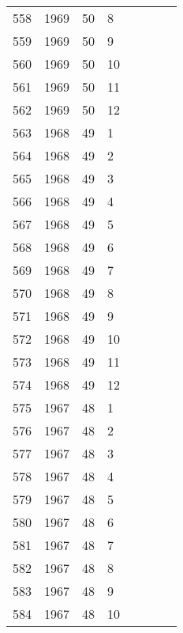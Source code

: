 \begin{longtable}{ |l|l|l|l|l|l|l|l| }
558 & 1969 & 50 &     8 &         &                &  & \\
559 & 1969 & 50 &     9 &         &                &  & \\
560 & 1969 & 50 &    10 &         &                &  & \\
561 & 1969 & 50 &    11 &         &                &  & \\
562 & 1969 & 50 &    12 &         &                &  & \\
563 & 1968 & 49 &     1 &         &                &  & \\
564 & 1968 & 49 &     2 &         &                &  & \\
565 & 1968 & 49 &     3 &         &                &  & \\
566 & 1968 & 49 &     4 &         &                &  & \\
567 & 1968 & 49 &     5 &         &                &  & \\
568 & 1968 & 49 &     6 &         &                &  & \\
569 & 1968 & 49 &     7 &         &                &  & \\
570 & 1968 & 49 &     8 &         &                &  & \\
571 & 1968 & 49 &     9 &         &                &  & \\
572 & 1968 & 49 &    10 &         &                &  & \\
573 & 1968 & 49 &    11 &         &                &  & \\
574 & 1968 & 49 &    12 &         &                &  & \\
575 & 1967 & 48 &     1 &         &                &  & \\
576 & 1967 & 48 &     2 &         &                &  & \\
577 & 1967 & 48 &     3 &         &                &  & \\
578 & 1967 & 48 &     4 &         &                &  & \\
579 & 1967 & 48 &     5 &         &                &  & \\
580 & 1967 & 48 &     6 &         &                &  & \\
581 & 1967 & 48 &     7 &         &                &  & \\
582 & 1967 & 48 &     8 &         &                &  & \\
583 & 1967 & 48 &     9 &         &                &  & \\
584 & 1967 & 48 &    10 &         &                &  & \\

\end{longtable}
